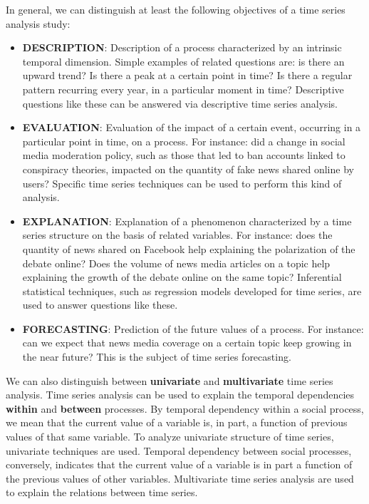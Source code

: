 \documentclass[
]{article}
\providecommand{\tightlist}{%
  \setlength{\itemsep}{0pt}\setlength{\parskip}{0pt}}
\begin{document}
In general, we can distinguish at least the following objectives of a time series analysis study:

\begin{itemize}
\tightlist
\item
  \textbf{DESCRIPTION}: Description of a process characterized by an intrinsic temporal dimension. Simple examples of related questions are: is there an upward trend? Is there a peak at a certain point in time? Is there a regular pattern recurring every year, in a particular moment in time? Descriptive questions like these can be answered via descriptive time series analysis.
\item
  \textbf{EVALUATION}: Evaluation of the impact of a certain event, occurring in a particular point in time, on a process. For instance: did a change in social media moderation policy, such as those that led to ban accounts linked to conspiracy theories, impacted on the quantity of fake news shared online by users? Specific time series techniques can be used to perform this kind of analysis.
\item
  \textbf{EXPLANATION}: Explanation of a phenomenon characterized by a time series structure on the basis of related variables. For instance: does the quantity of news shared on Facebook help explaining the polarization of the debate online? Does the volume of news media articles on a topic help explaining the growth of the debate online on the same topic? Inferential statistical techniques, such as regression models developed for time series, are used to answer questions like these.
\item
  \textbf{FORECASTING}: Prediction of the future values of a process. For instance: can we expect that news media coverage on a certain topic keep growing in the near future? This is the subject of time series forecasting.
\end{itemize}

We can also distinguish between \textbf{univariate} and \textbf{multivariate} time series analysis. Time series analysis can be used to explain the temporal dependencies \textbf{within} and \textbf{between} processes. By temporal dependency within a social process, we mean that the current value of a variable is, in part, a function of previous values of that same variable. To analyze univariate structure of time series, univariate techniques are used. Temporal dependency between social processes, conversely, indicates that the current value of a variable is in part a function of the previous values of other variables. Multivariate time series analysis are used to explain the relations between time series.
\end{document}
